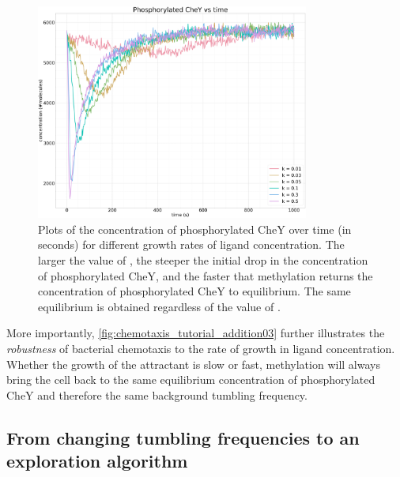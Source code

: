 \begin{figure}[h]
\centering
\mySfFamily
\includegraphics[width = 0.8\textwidth]{../images/chemotaxis_tutorial_addition03.png}
\caption{Plots of the concentration of phosphorylated CheY over time (in seconds) for different growth rates  of ligand concentration. The larger the value of , the steeper the initial drop in the concentration of phosphorylated CheY, and the faster that methylation returns the concentration of phosphorylated CheY to equilibrium. The same equilibrium is obtained regardless of the value of .}
\label{fig:chemotaxis_tutorial_addition03}
\end{figure}

More importantly, \autoref{fig:chemotaxis_tutorial_addition03} further illustrates the \textit{robustness} of bacterial chemotaxis to the rate of growth in ligand concentration. Whether the growth of the attractant is slow or fast, methylation will always bring the cell back to the same equilibrium concentration of phosphorylated CheY and therefore the same background tumbling frequency.\\

\begin{qbox}\end{qbox}

\FloatBarrier
{}
\subsection{From changing tumbling frequencies to an exploration algorithm}

